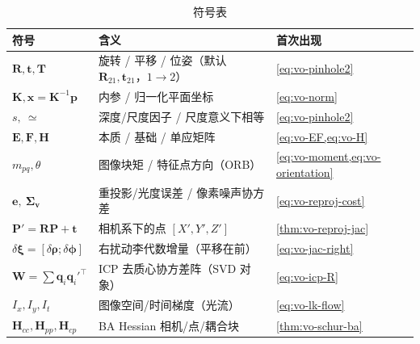 \begin{table}[H]\centering\small
\caption{符号表}
\begin{tabular}{lll}
\toprule
符号 & 含义 & 首次出现 \\
\midrule
$\mathbf{R},\mathbf{t},\mathbf{T}$ & 旋转 / 平移 / 位姿（默认 $\mathbf{R}_{21},\mathbf{t}_{21}$，$1\!\to\!2$） & \cref{eq:vo-pinhole2} \\
$\mathbf{K},\mathbf{x}=\mathbf{K}^{-1}\mathbf{p}$ & 内参 / 归一化平面坐标 & \cref{eq:vo-norm} \\
$s,\ \simeq$ & 深度/尺度因子 / 尺度意义下相等 & \cref{eq:vo-pinhole2} \\
$\mathbf{E},\mathbf{F},\mathbf{H}$ & 本质 / 基础 / 单应矩阵 & \cref{eq:vo-EF,eq:vo-H} \\
$m_{pq},\theta$ & 图像块矩 / 特征点方向（ORB） & \cref{eq:vo-moment,eq:vo-orientation} \\
$\mathbf{e},\ \boldsymbol{\Sigma}_{\mathbf v}$ & 重投影/光度误差 / 像素噪声协方差 & \cref{eq:vo-reproj-cost} \\
$\mathbf{P}'=\mathbf{R}\mathbf{P}+\mathbf{t}$ & 相机系下的点 $[X',Y',Z']$ & \cref{thm:vo-reproj-jac} \\
$\delta\boldsymbol{\xi}=[\delta\boldsymbol{\rho};\delta\boldsymbol{\phi}]$ & 右扰动李代数增量（平移在前） & \cref{eq:vo-jac-right} \\
$\mathbf{W}=\sum\mathbf{q}_i\mathbf{q}_i'^\top$ & ICP 去质心协方差阵（SVD 对象） & \cref{eq:vo-icp-R} \\
$I_x,I_y,I_t$ & 图像空间/时间梯度（光流） & \cref{eq:vo-lk-flow} \\
$\mathbf{H}_{cc},\mathbf{H}_{pp},\mathbf{H}_{cp}$ & BA Hessian 相机/点/耦合块 & \cref{thm:vo-schur-ba} \\
\bottomrule
\end{tabular}
\end{table}

